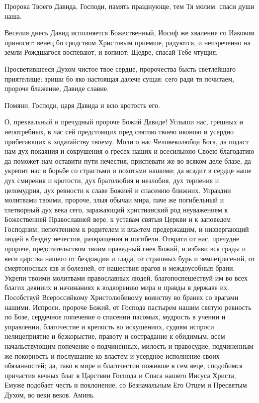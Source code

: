 Пророка Твоего Давида, Господи, память празднующе, тем Тя молим: спаси души наша.




Веселия днесь Давид исполняется Божественный, Иосиф же хваление со Иаковом приносит: венец бо сродством Христовым приемше, радуются, и неизреченно на земли Рождшагося воспевают, и вопиют: Щедре, спасай Тебе чтущия.




Просветившееся Духом чистое твое сердце, пророчества бысть светлейшаго приятелище: зриши бо яко настоящая далече сущая: сего ради тя почитаем, пророче блаженне, Давиде славне.




Помяни, Господи, царя Давида и всю кротость его.




О, прехвальный и пречудный пророче Божий Давиде! Услыши нас, грешных и непотребных, в час сей предстоящих пред святою твоею иконою и усердно прибегающих к ходатайству твоему. Моли о нас Человеколюбца Бога, да подаст нам дух покаяния и сокрушения о гресех наших и всесильною Своею благодатию да поможет нам оставити пути нечестия, приспевати же во всяком деле блазе, да укрепит нас в борьбе со страстьми и похотьми нашими; да всадит в сердце наше дух смирения и кротости, дух братолюбия и незлобия, дух терпения и целомудрия, дух ревности к славе Божией и спасению ближних. Упраздни молитвами твоими, пророче, злыя обычаи мира, паче же погибельный и тлетворный дух века сего, заражающий христианский род неуважением к Божественней Православней вере, к уставам святыя Церкви и к заповедем Господним, непочтением к родителем и влаcтем предержащим, и низвергающий людей в бездну нечестия, развращения и погибели. Отврати от нас, пречудне пророче, предстательством твоим праведный гнев Божий, и избави вся грады и веси царства нашего от бездождия и глада, от страшных бурь и землетрясений, от смертоносных язв и болезней, от нашествия врагов и междоусобныя брани. Укрепи твоими молитвами православных людей, благопоспешествуй им во всех благих деяниих и начинаниях к водворению мира и правды в державе их. Пособствуй Всероссийкому Христолюбивому воинству во бранех со врагами нашими. Испроси, пророче Божий, от Господа пастырем нашим святую ревность по Бозе, сердечное попечение о спасении пасомых, мудрость в учении и управлении, благочестие и крепость во искушениих, судиям испроси нелицеприятие и безкорыстие, правоту и сострадание к обидимым, всем начальствующим попечение о подчиненных, милость и правосудие, подчиненным же покорность и послушание ко властем и усердное исполнение своих обязанностей; да, тако в мире и благочестии поживше в сем веце, сподобимся причастия вечных благ в Царствии Господа и Спаса нашего Иисуса Христа, Емуже подобает честь и поклонение, со Безначальным Его Отцем и Пресвятым Духом, во веки веков. Аминь.


